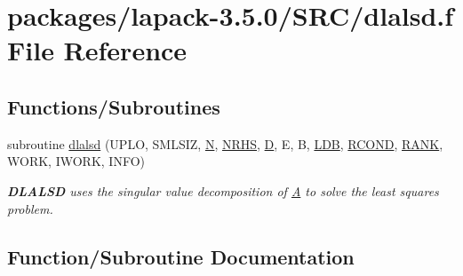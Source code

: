 \hypertarget{dlalsd_8f}{}\section{packages/lapack-\/3.5.0/\+S\+R\+C/dlalsd.f File Reference}
\label{dlalsd_8f}
\subsection*{Functions/\+Subroutines}
\begin{DoxyCompactItemize}
\item 
subroutine \hyperlink{dlalsd_8f_ad9672df73e817eee614a97daea1341b0}{dlalsd} (U\+P\+L\+O, S\+M\+L\+S\+I\+Z, \hyperlink{polmisc_8c_a0240ac851181b84ac374872dc5434ee4}{N}, \hyperlink{example__user_8c_aa0138da002ce2a90360df2f521eb3198}{N\+R\+H\+S}, \hyperlink{odrpack_8h_a7dae6ea403d00f3687f24a874e67d139}{D}, E, B, \hyperlink{example__user_8c_a50e90a7104df172b5a89a06c47fcca04}{L\+D\+B}, \hyperlink{superlu__enum__consts_8h_af00a42ecad444bbda75cde1b64bd7e72a9b5c151728d8512307565994c89919d5}{R\+C\+O\+N\+D}, \hyperlink{splinemodule_8c_a3a88bcc63386de30443dacede2e01847}{R\+A\+N\+K}, W\+O\+R\+K, I\+W\+O\+R\+K, I\+N\+F\+O)
\begin{DoxyCompactList}\small\item\em {\bfseries D\+L\+A\+L\+S\+D} uses the singular value decomposition of \hyperlink{classA}{A} to solve the least squares problem. \end{DoxyCompactList}\end{DoxyCompactItemize}


\subsection{Function/\+Subroutine Documentation}
\hypertarget{dlalsd_8f_ad9672df73e817eee614a97daea1341b0}{}
